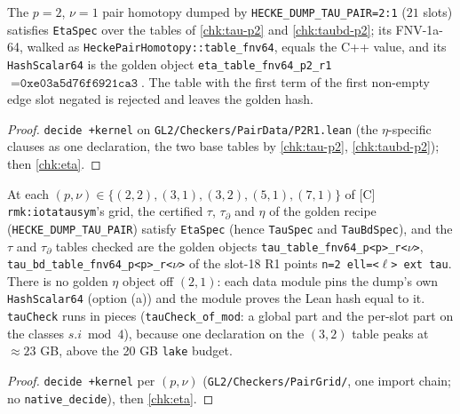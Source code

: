 \begin{theorem}[\texttt{obl:eta} (i)--(iv) on the real golden $p=2$ table]\label{chk:eta-p2}
  \leanok
  The $p=2$, $\nu=1$ pair homotopy dumped by \texttt{HECKE\_DUMP\_TAU\_PAIR=2:1} ($21$ slots) satisfies \texttt{EtaSpec} over the
  tables of \ref{chk:tau-p2} and \ref{chk:taubd-p2}; its FNV-1a-64, walked as \texttt{HeckePairHomotopy::table\_fnv64}, equals the
  C++ value, and its \texttt{HashScalar64} is the golden object \texttt{eta\_table\_fnv64\_p2\_r1} $=\texttt{0xe03a5d76f6921ca3}$.
  The table with the first term of the first non-empty edge slot negated is rejected and leaves the golden hash.
\end{theorem}
\begin{proof}
  \leanok
  \texttt{decide +kernel} on \texttt{GL2/Checkers/PairData/P2R1.lean} (the $\eta$-specific clauses as one declaration, the two
  base tables by \ref{chk:tau-p2}, \ref{chk:taubd-p2}); then \ref{chk:eta}.
\end{proof}

\begin{theorem}\label{chk:pairgrid}
  \leanok
  At each $(p,\nu)\in\{(2,2),(3,1),(3,2),(5,1),(7,1)\}$ of [C] \texttt{rmk:iotatausym}'s grid, the certified $\tau$, $\tau_\partial$ and
  $\eta$ of the golden recipe (\texttt{HECKE\_DUMP\_TAU\_PAIR}) satisfy \texttt{EtaSpec} (hence \texttt{TauSpec} and
  \texttt{TauBdSpec}), and the $\tau$ and $\tau_\partial$ tables checked are the golden objects
  \texttt{tau\_table\_fnv64\_p<p>\_r<$\nu$>}, \texttt{tau\_bd\_table\_fnv64\_p<p>\_r<$\nu$>} of the slot-18 R1 points
  \texttt{n=2 ell=<$\ell$> ext tau}. There is no golden $\eta$ object off $(2,1)$: each data module pins the dump's own
  \texttt{HashScalar64} (option (a)) and the module proves the Lean hash equal to it. \texttt{tauCheck} runs in pieces
  (\texttt{tauCheck\_of\_mod}: a global part and the per-slot part on the classes $s.i \bmod 4$), because one declaration on
  the $(3,2)$ table peaks at $\approx 23$ GB, above the 20 GB \texttt{lake} budget.
\end{theorem}
\begin{proof}
  \leanok
  \texttt{decide +kernel} per $(p,\nu)$ (\texttt{GL2/Checkers/PairGrid/}, one import chain; no \texttt{native\_decide}), then
  \ref{chk:eta}.
\end{proof}

